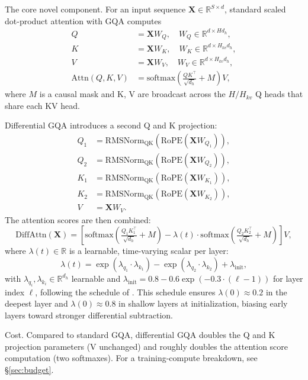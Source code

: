 \documentclass[11pt,a4paper]{article}
\theoremstyle{definition}
\theoremstyle{remark}
\newcommand{\R}{\mathbb{R}}
\newcommand{\softmax}{\mathrm{softmax}}
\newcommand{\rmsnorm}{\mathrm{RMSNorm}}
\newcommand{\rope}{\mathrm{RoPE}}
\newcommand{\attn}{\mathrm{Attn}}
\newcommand{\diffattn}{\mathrm{DiffAttn}}
\begin{document}
The core novel component. For an input sequence
$\mathbf{X} \in \R^{S \times d}$, standard scaled dot-product
attention with GQA computes
\begin{align}
Q &= \mathbf{X} W_Q,\quad W_Q \in \R^{d \times H d_h}, \\
K &= \mathbf{X} W_K,\quad W_K \in \R^{d \times H_{kv} d_h}, \\
V &= \mathbf{X} W_V,\quad W_V \in \R^{d \times H_{kv} d_h}, \\
\attn(Q, K, V) &= \softmax\!\left(\frac{Q K^\top}{\sqrt{d_h}} + M\right) V,
\end{align}
where $M$ is a causal mask and K, V are broadcast across the
$H / H_{kv}$ Q heads that share each KV head.

Differential GQA introduces a second Q and K projection:
\begin{align}
Q_1 &= \rmsnorm_\text{QK}(\rope(\mathbf{X} W_{Q_1})), \\
Q_2 &= \rmsnorm_\text{QK}(\rope(\mathbf{X} W_{Q_2})), \\
K_1 &= \rmsnorm_\text{QK}(\rope(\mathbf{X} W_{K_1})), \\
K_2 &= \rmsnorm_\text{QK}(\rope(\mathbf{X} W_{K_2})), \\
V   &= \mathbf{X} W_V.
\end{align}
The attention scores are then combined:
\begin{equation}
\diffattn(\mathbf{X})
   = \left[
       \softmax\!\left(\tfrac{Q_1 K_1^\top}{\sqrt{d_h}} + M\right)
     - \lambda(t) \cdot
       \softmax\!\left(\tfrac{Q_2 K_2^\top}{\sqrt{d_h}} + M\right)
     \right] V,
\label{eq:diffattn}
\end{equation}
where $\lambda(t) \in \R$ is a learnable, time-varying scalar per layer:
\begin{equation}
\lambda(t) = \exp(\lambda_{q_1} \cdot \lambda_{k_1})
           - \exp(\lambda_{q_2} \cdot \lambda_{k_2}) + \lambda_\text{init},
\end{equation}
with $\lambda_{q_i}, \lambda_{k_i} \in \R^{d_h}$ learnable and
$\lambda_\text{init} = 0.8 - 0.6 \exp(-0.3 \cdot (\ell - 1))$ for layer
index $\ell$, following the schedule of \citet{ye2024differential}.
This schedule ensures $\lambda(0) \approx 0.2$ in the deepest layer and
$\lambda(0) \approx 0.8$ in shallow layers at initialization, biasing
early layers toward stronger differential subtraction.

Cost. Compared to standard GQA, differential GQA doubles the Q and K
projection parameters (V unchanged) and roughly doubles the attention
score computation (two softmaxes). For a training-compute breakdown, see
\S\ref{sec:budget}.
\end{document}
